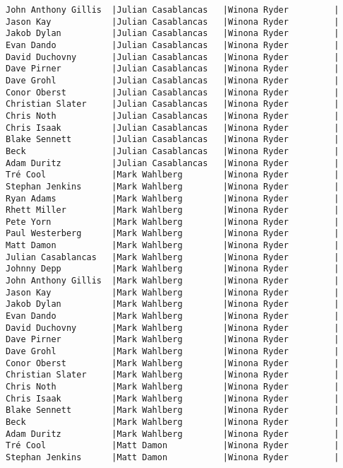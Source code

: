 \documentclass{article}
\begin{document}
\begin{verbatim}
John Anthony Gillis  |Julian Casablancas   |Winona Ryder         |
Jason Kay            |Julian Casablancas   |Winona Ryder         |
Jakob Dylan          |Julian Casablancas   |Winona Ryder         |
Evan Dando           |Julian Casablancas   |Winona Ryder         |
David Duchovny       |Julian Casablancas   |Winona Ryder         |
Dave Pirner          |Julian Casablancas   |Winona Ryder         |
Dave Grohl           |Julian Casablancas   |Winona Ryder         |
Conor Oberst         |Julian Casablancas   |Winona Ryder         |
Christian Slater     |Julian Casablancas   |Winona Ryder         |
Chris Noth           |Julian Casablancas   |Winona Ryder         |
Chris Isaak          |Julian Casablancas   |Winona Ryder         |
Blake Sennett        |Julian Casablancas   |Winona Ryder         |
Beck                 |Julian Casablancas   |Winona Ryder         |
Adam Duritz          |Julian Casablancas   |Winona Ryder         |
Tré Cool             |Mark Wahlberg        |Winona Ryder         |
Stephan Jenkins      |Mark Wahlberg        |Winona Ryder         |
Ryan Adams           |Mark Wahlberg        |Winona Ryder         |
Rhett Miller         |Mark Wahlberg        |Winona Ryder         |
Pete Yorn            |Mark Wahlberg        |Winona Ryder         |
Paul Westerberg      |Mark Wahlberg        |Winona Ryder         |
Matt Damon           |Mark Wahlberg        |Winona Ryder         |
Julian Casablancas   |Mark Wahlberg        |Winona Ryder         |
Johnny Depp          |Mark Wahlberg        |Winona Ryder         |
John Anthony Gillis  |Mark Wahlberg        |Winona Ryder         |
Jason Kay            |Mark Wahlberg        |Winona Ryder         |
Jakob Dylan          |Mark Wahlberg        |Winona Ryder         |
Evan Dando           |Mark Wahlberg        |Winona Ryder         |
David Duchovny       |Mark Wahlberg        |Winona Ryder         |
Dave Pirner          |Mark Wahlberg        |Winona Ryder         |
Dave Grohl           |Mark Wahlberg        |Winona Ryder         |
Conor Oberst         |Mark Wahlberg        |Winona Ryder         |
Christian Slater     |Mark Wahlberg        |Winona Ryder         |
Chris Noth           |Mark Wahlberg        |Winona Ryder         |
Chris Isaak          |Mark Wahlberg        |Winona Ryder         |
Blake Sennett        |Mark Wahlberg        |Winona Ryder         |
Beck                 |Mark Wahlberg        |Winona Ryder         |
Adam Duritz          |Mark Wahlberg        |Winona Ryder         |
Tré Cool             |Matt Damon           |Winona Ryder         |
Stephan Jenkins      |Matt Damon           |Winona Ryder         |

\end{verbatim}
\end{document}
